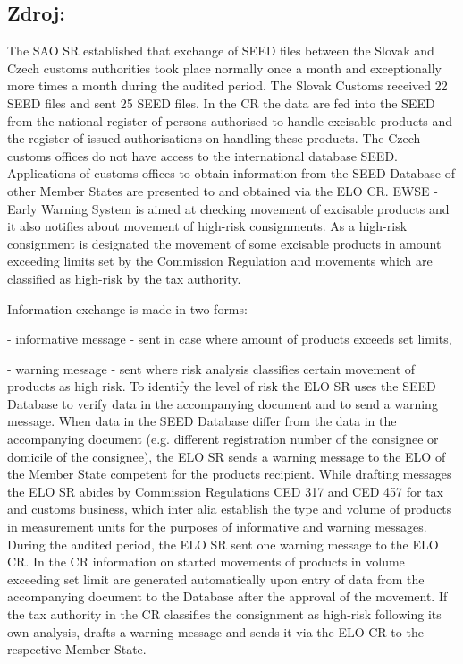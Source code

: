 \documentclass[10pt]{article}
\begin{document}
\subsection*{Zdroj:}

The SAO SR established that exchange of SEED files between the Slovak and Czech customs authorities took place normally once a month and exceptionally more times a month during the audited period.
The Slovak Customs received 22 SEED files and sent 25 SEED files.
In the CR the data are fed into the SEED from the national register of persons authorised to handle excisable products and the register of issued authorisations on handling these products.
The Czech customs offices do not have access to the international database SEED.
Applications of customs offices to obtain information from the SEED Database of other Member States are presented to and obtained via the ELO CR.
EWSE - Early Warning System is aimed at checking movement of excisable products and it also notifies about movement of high-risk consignments.
As a high-risk consignment is designated the movement of some excisable products in amount exceeding limits set by the Commission Regulation and movements which are classified as high-risk by the tax authority.


Information exchange is made in two forms:



- informative message - sent in case where amount of products exceeds set limits,

- warning message - sent where risk analysis classifies certain movement of products as high risk.
To identify the level of risk the ELO SR uses the SEED Database to verify data in the accompanying document and to send a warning message.
When data in the SEED Database differ from the data in the accompanying document (e.g. different registration number of the consignee or domicile of the consignee), the ELO SR sends a warning message to the ELO of the Member State competent for the products recipient.
While drafting messages the ELO SR abides by Commission Regulations CED 317 and CED 457 for tax and customs business, which inter alia establish the type and volume of products in measurement units for the purposes of informative and warning messages.
During the audited period, the ELO SR sent one warning message to the ELO CR.
In the CR information on started movements of products in volume exceeding set limit are generated automatically upon entry of data from the accompanying document to the Database after the approval of the movement.
If the tax authority in the CR classifies the consignment as high-risk following its own analysis, drafts a warning message and sends it via the ELO CR to the respective Member State.
\end{document}
